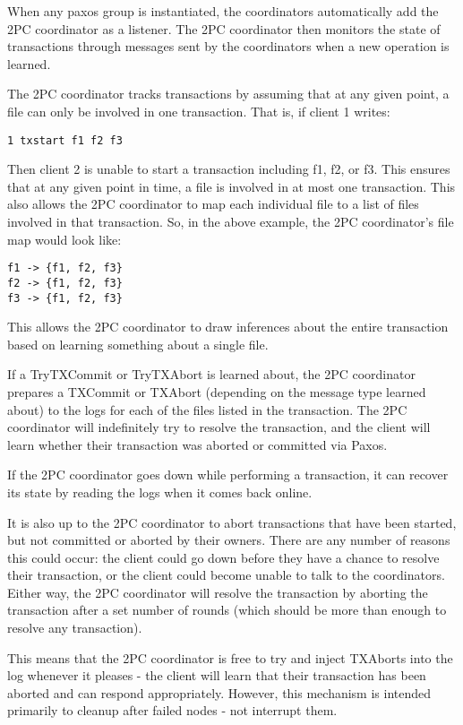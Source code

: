 \documentclass[11pt]{article}
\begin{document}
When any paxos group is instantiated, the coordinators automatically add the 2PC coordinator as a listener. The 2PC coordinator then monitors the state of transactions through messages sent by the coordinators when a new operation is learned.

The 2PC coordinator tracks transactions by assuming that at any given point, a file can only be involved in one transaction. That is, if client 1 writes:
\begin{verbatim}
1 txstart f1 f2 f3
\end{verbatim}

Then client 2 is unable to start a transaction including f1, f2, or f3. This ensures that at any given point in time, a file is involved in at most one transaction. This also allows the 2PC coordinator to map each individual file to a list of files involved in that transaction. So, in the above example, the 2PC coordinator's file map would look like:

\begin{verbatim}
f1 -> {f1, f2, f3}
f2 -> {f1, f2, f3}
f3 -> {f1, f2, f3}
\end{verbatim}
This allows the 2PC coordinator to draw inferences about the entire transaction based on learning something about a single file.

If a TryTXCommit or TryTXAbort is learned about, the 2PC coordinator prepares a TXCommit or TXAbort (depending on the message type learned about) to the logs for each of the files listed in the transaction. The 2PC coordinator will indefinitely try to resolve the transaction, and the client will learn whether their transaction was aborted or committed via Paxos. 

If the 2PC coordinator goes down while performing a transaction, it can recover its state by reading the logs when it comes back online.

It is also up to the 2PC coordinator to abort transactions that have been started, but not committed or aborted by their owners. There are any number of reasons this could occur: the client could go down before they have a chance to resolve their transaction, or the client could become unable to talk to the coordinators. Either way, the 2PC coordinator will resolve the transaction by aborting the transaction after a set number of rounds (which should be more than enough to resolve any transaction).

This means that the 2PC coordinator is free to try and inject TXAborts into the log whenever it pleases - the client will learn that their transaction has been aborted and can respond appropriately. However, this mechanism is intended primarily to cleanup after failed nodes - not interrupt them.
\end{document}
